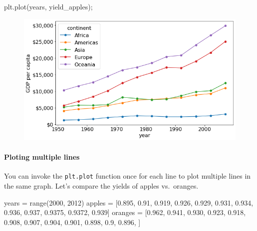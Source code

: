 \documentclass[
  letterpaper,
  DIV=11,
  numbers=noendperiod]{scrreprt}
\let\oldparagraph\paragraph
\renewcommand{\paragraph}[1]{\oldparagraph{#1}\mbox{}}
\newenvironment{Shaded}{\begin{snugshade}}{\end{snugshade}}
\newcommand{\BuiltInTok}[1]{\textcolor[rgb]{0.00,0.23,0.31}{#1}}
\newcommand{\DecValTok}[1]{\textcolor[rgb]{0.68,0.00,0.00}{#1}}
\newcommand{\FloatTok}[1]{\textcolor[rgb]{0.68,0.00,0.00}{#1}}
\newcommand{\NormalTok}[1]{\textcolor[rgb]{0.00,0.23,0.31}{#1}}
\newcommand{\OperatorTok}[1]{\textcolor[rgb]{0.37,0.37,0.37}{#1}}
\begin{document}
\begin{Shaded}
\begin{Highlighting}[]
\NormalTok{plt.plot(years, yield\_apples)}\OperatorTok{;}
\end{Highlighting}
\end{Shaded}

\begin{figure}[H]

{\centering \includegraphics{Data visualization_files/figure-pdf/cell-18-output-1.png}

}

\end{figure}

\hypertarget{ploting-multiple-lines}{%
\paragraph{Ploting multiple lines}\label{ploting-multiple-lines}}

You can invoke the \texttt{plt.plot} function once for each line to plot
multiple lines in the same graph. Let's compare the yields of apples
vs.~oranges.

\begin{Shaded}
\begin{Highlighting}[]
\NormalTok{years }\OperatorTok{=} \BuiltInTok{range}\NormalTok{(}\DecValTok{2000}\NormalTok{, }\DecValTok{2012}\NormalTok{)}
\NormalTok{apples }\OperatorTok{=}\NormalTok{ [}\FloatTok{0.895}\NormalTok{, }\FloatTok{0.91}\NormalTok{, }\FloatTok{0.919}\NormalTok{, }\FloatTok{0.926}\NormalTok{, }\FloatTok{0.929}\NormalTok{, }\FloatTok{0.931}\NormalTok{, }\FloatTok{0.934}\NormalTok{, }\FloatTok{0.936}\NormalTok{, }\FloatTok{0.937}\NormalTok{, }\FloatTok{0.9375}\NormalTok{, }\FloatTok{0.9372}\NormalTok{, }\FloatTok{0.939}\NormalTok{]}
\NormalTok{oranges }\OperatorTok{=}\NormalTok{ [}\FloatTok{0.962}\NormalTok{, }\FloatTok{0.941}\NormalTok{, }\FloatTok{0.930}\NormalTok{, }\FloatTok{0.923}\NormalTok{, }\FloatTok{0.918}\NormalTok{, }\FloatTok{0.908}\NormalTok{, }\FloatTok{0.907}\NormalTok{, }\FloatTok{0.904}\NormalTok{, }\FloatTok{0.901}\NormalTok{, }\FloatTok{0.898}\NormalTok{, }\FloatTok{0.9}\NormalTok{, }\FloatTok{0.896}\NormalTok{, ]}
\end{Highlighting}
\end{Shaded}
\end{document}
